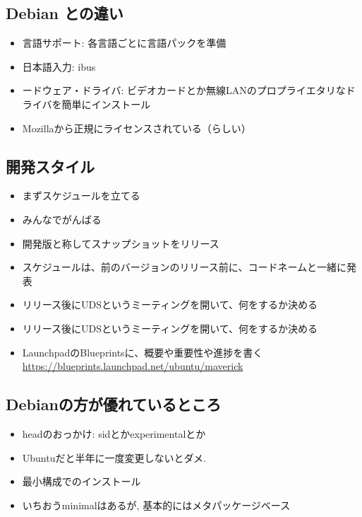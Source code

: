 \documentclass[mingoth,a4paper]{jsarticle}
\begin{document}
\subsection{Debian との違い}
\begin{itemize}
      \item 言語サポート: 各言語ごとに言語パックを準備
      \item 日本語入力: ibus 
      \item ードウェア・ドライバ: ビデオカードとか無線LANのプロプライエタリなドライバを簡単にインストール
      \item Mozillaから正規にライセンスされている（らしい）
\end{itemize}

\subsection{開発スタイル}
 
  \begin{itemize}
        \item まずスケジュールを立てる
        \item みんなでがんばる
        \item 開発版と称してスナップショットをリリース
        \item スケジュールは、前のバージョンのリリース前に、コードネームと一緒に発表
        \item リリース後にUDSというミーティングを開いて、何をするか決める
        \item リリース後にUDSというミーティングを開いて、何をするか決める
        \item LaunchpadのBlueprintsに、概要や重要性や進捗を書く\\
      \url{https://blueprints.launchpad.net/ubuntu/maverick}
  \end{itemize}

  \subsection{Debianの方が優れているところ}
  \begin{itemize}
        \item headのおっかけ: sidとかexperimentalとか
        \item Ubuntuだと半年に一度変更しないとダメ.
        \item 最小構成でのインストール
        \item いちおうminimalはあるが,
      基本的にはメタパッケージベース
  \end{itemize}
\end{document}
